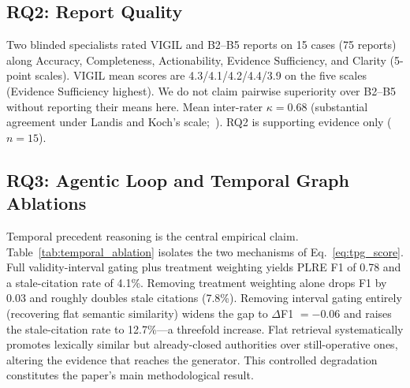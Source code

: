 \subsection{RQ2: Report Quality}

Two blinded specialists rated VIGIL and B2--B5 reports on 15 cases (75 reports) along Accuracy, Completeness, Actionability, Evidence Sufficiency, and Clarity (5-point scales). VIGIL mean scores are 4.3/4.1/4.2/4.4/3.9 on the five scales (Evidence Sufficiency highest). We do not claim pairwise superiority over B2--B5 without reporting their means here. Mean inter-rater $\kappa=0.68$ (substantial agreement under Landis and Koch's scale;~\citep{landis1977kappa}). RQ2 is supporting evidence only ($n{=}15$).

\subsection{RQ3: Agentic Loop and Temporal Graph Ablations}

Temporal precedent reasoning is the central empirical claim. Table~\ref{tab:temporal_ablation} isolates the two mechanisms of Eq.~\eqref{eq:tpg_score}. Full validity-interval gating plus treatment weighting yields PLRE F1 of 0.78 and a stale-citation rate of 4.1\%. Removing treatment weighting alone drops F1 by 0.03 and roughly doubles stale citations (7.8\%). Removing interval gating entirely (recovering flat semantic similarity) widens the gap to $\Delta$F1 ${=}{-}0.06$ and raises the stale-citation rate to 12.7\%---a threefold increase. Flat retrieval systematically promotes lexically similar but already-closed authorities over still-operative ones, altering the evidence that reaches the generator. This controlled degradation constitutes the paper's main methodological result.

\begin{table}[t]
\centering
\caption{Temporal precedent-graph ablation (main claim). Both mechanisms of Eq.~\eqref{eq:tpg_score} are removed in sequence; the bottom row recovers flat semantic similarity. Full gating cuts the stale-citation rate from 12.7\% to 4.1\% while improving PLRE F1 by 0.06. Stale-cite measures citations to already-closed precedent ($t_q\!\ge\!e_v$).}
\label{tab:temporal_ablation}
\small
\setlength{\tabcolsep}{4pt}
\end{table}

